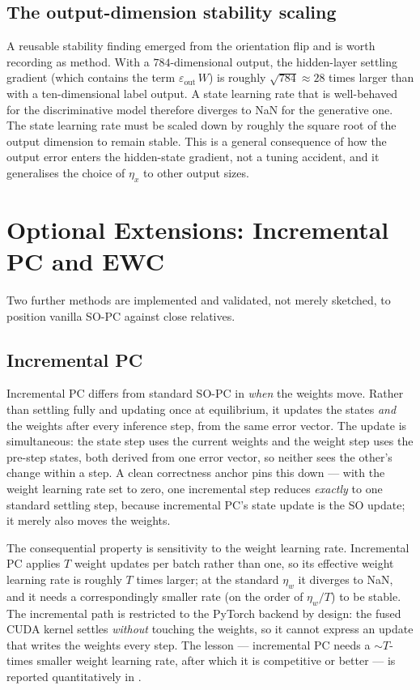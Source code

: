 \subsection{The output-dimension stability scaling}

A reusable stability finding emerged from the orientation flip and is worth recording as method. With a
$784$-dimensional output, the hidden-layer settling gradient (which contains the term
$\varepsilon_{\text{out}}\,W$) is roughly $\sqrt{784}\approx 28$ times larger than with a ten-dimensional
label output. A state learning rate that is well-behaved for the discriminative model therefore diverges
to NaN for the generative one. The state learning rate must be scaled down by roughly the square root of
the output dimension to remain stable. This is a general consequence of how the output error enters the
hidden-state gradient, not a tuning accident, and it generalises the choice of $\eta_x$ to other output
sizes.

\section{Optional Extensions: Incremental PC and EWC}

Two further methods are implemented and validated, not merely sketched, to position vanilla SO-PC
against close relatives.

\subsection{Incremental PC}

Incremental PC \citep{salvatori2024ipc} differs from standard SO-PC in \emph{when} the weights move.
Rather than settling fully and updating once at equilibrium, it updates the states \emph{and} the
weights after every inference step, from the same error vector. The update is simultaneous: the state
step uses the current weights and the weight step uses the pre-step states, both derived from one error
vector, so neither sees the other's change within a step. A clean correctness anchor pins this down ---
with the weight learning rate set to zero, one incremental step reduces \emph{exactly} to one standard
settling step, because incremental PC's state update is the SO update; it merely also moves the weights.

The consequential property is sensitivity to the weight learning rate. Incremental PC applies $T$ weight
updates per batch rather than one, so its effective weight learning rate is roughly $T$ times larger; at
the standard $\eta_w$ it diverges to NaN, and it needs a correspondingly smaller rate (on the order of
$\eta_w / T$) to be stable. The incremental path is restricted to the PyTorch backend by design: the
fused CUDA kernel settles \emph{without} touching the weights, so it cannot express an update that writes
the weights every step. The lesson --- incremental PC needs a $\sim T$-times smaller weight learning
rate, after which it is competitive or better --- is reported quantitatively in .

